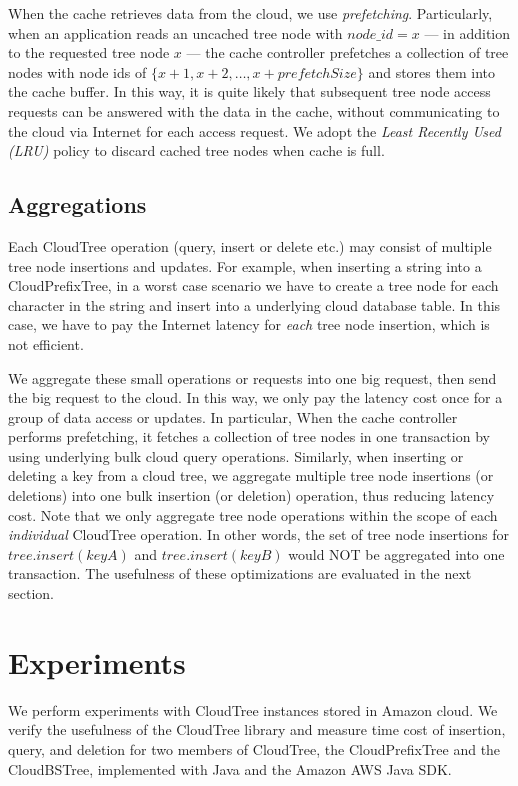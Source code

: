 \documentclass[10pt, conference, compsocconf]{IEEEtran}
\begin{document}
When the cache retrieves data from the cloud, we use \emph{prefetching}.
Particularly, when an application reads an uncached tree node with $node\_id = x$ --- 
in addition to the requested tree node $x$ --- the cache controller prefetches a collection of tree nodes
with node ids of $\{x + 1, x + 2, \ldots, x + prefetchSize\}$ and stores them into the cache buffer.
In this way, it is quite likely that subsequent tree node access requests can be answered with the data
in the cache, without communicating to the cloud via Internet for each access request.
We adopt the \emph{Least Recently Used (LRU)}  policy \cite{LRU12} to discard cached tree nodes when cache is full.

\subsection{Aggregations}
Each CloudTree operation (query, insert or delete etc.) may consist of multiple tree node insertions and updates.
For example, when inserting a string into a CloudPrefixTree, 
in a worst case scenario we have to create a tree node for each character in the string and insert into a underlying cloud database table.
In this case, we have to pay the Internet latency for \emph{each} tree node insertion, which is not efficient.

We aggregate these small operations or requests into one big request, then send the big request to the cloud.
In this way, we only pay the latency cost once for a group of data access or updates.  In particular,
When the cache controller performs prefetching, it fetches a collection of tree nodes in one transaction by using
underlying bulk cloud query operations. Similarly, when inserting or deleting a key from a cloud tree,
we aggregate multiple tree node insertions (or deletions) into one bulk insertion (or deletion) operation, thus reducing latency cost.
Note that we only aggregate tree node operations within the scope of each \emph{individual} CloudTree operation. In other words, the set of
tree node insertions for $tree.insert(keyA)$ and $tree.insert(keyB)$ would NOT be aggregated into one transaction.
The usefulness of these optimizations are evaluated in the next section.

\section{Experiments}
\label{tests}
We perform experiments with CloudTree instances stored in Amazon cloud. 
We verify the usefulness of the CloudTree library and 
measure time cost of insertion, query, and deletion for
two members of CloudTree, the CloudPrefixTree and the CloudBSTree, implemented 
with Java and the Amazon AWS Java SDK.
\end{document}
